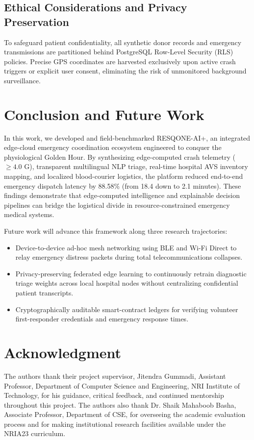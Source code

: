 \documentclass[conference]{IEEEtran}
\begin{document}
\subsection{Ethical Considerations and Privacy Preservation}
To safeguard patient confidentiality, all synthetic donor records and emergency transmissions are partitioned behind PostgreSQL Row-Level Security (RLS) policies. Precise GPS coordinates are harvested exclusively upon active crash triggers or explicit user consent, eliminating the risk of unmonitored background surveillance.

\section{Conclusion and Future Work}
In this work, we developed and field-benchmarked RESQONE-AI+, an integrated edge-cloud emergency coordination ecosystem engineered to conquer the physiological Golden Hour. By synthesizing edge-computed crash telemetry ($\ge 4.0\text{ G}$), transparent multilingual NLP triage, real-time hospital AVS inventory mapping, and localized blood-courier logistics, the platform reduced end-to-end emergency dispatch latency by 88.58\% (from 18.4 down to 2.1 minutes). These findings demonstrate that edge-computed intelligence and explainable decision pipelines can bridge the logistical divide in resource-constrained emergency medical systems.

Future work will advance this framework along three research trajectories:
\begin{itemize}
    \item Device-to-device ad-hoc mesh networking using BLE and Wi-Fi Direct to relay emergency distress packets during total telecommunications collapses.
    \item Privacy-preserving federated edge learning to continuously retrain diagnostic triage weights across local hospital nodes without centralizing confidential patient transcripts.
    \item Cryptographically auditable smart-contract ledgers for verifying volunteer first-responder credentials and emergency response times.
\end{itemize}

\section*{Acknowledgment}
The authors thank their project supervisor, Jitendra Gummadi, Assistant Professor, Department of Computer Science and Engineering, NRI Institute of Technology, for his guidance, critical feedback, and continued mentorship throughout this project. The authors also thank Dr. Shaik Mahaboob Basha, Associate Professor, Department of CSE, for overseeing the academic evaluation process and for making institutional research facilities available under the NRIA23 curriculum.
\end{document}
